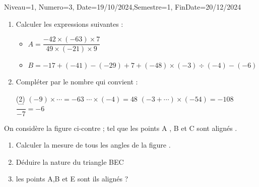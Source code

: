 \documentclass[a4paper,12pt]{article}
\begin{document}
\begin{Maquette}[DM]{Niveau=1, Numero=3, Date=19/10/2024,Semestre=1, FinDate=20/12/2024}

\begin{exercice}
\begin{enumerate}
\item Calculer les expressions suivantes :
\begin{itemize}
\item \(A= \dfrac{-42\times (-63)\times 7}{49\times (-21)\times 9}\)
\item \( B=-17+(-41)-(-29)+7+(-48)\times (-3)\div (-4)-(-6)\)
\end{itemize}

\item Compléter par le nombre qui convient :
\begin{tasks}[style=itemize](2)
\task \( (-9)\times \cdots = -63 \)
\task \( \cdots \times (-4) = 48\)
\task \( (-3+ \cdots )\times (-54)= -108\)
\task \(\dfrac{\cdots}{-7}=-6\)
\end{tasks}

\end{enumerate}
\end{exercice}

\begin{exercice}
\begin{minipage}{.58\linewidth}
On considère la figure ci-contre ; tel que les points A , B et C sont alignés .
\begin{enumerate}
\item Calculer la mesure de tous les angles de la figure .
\item Déduire la nature du triangle BEC
\item les points A,B et E sont ils alignés ?
\end{enumerate}
\end{minipage}
\begin{minipage}{.4\linewidth}
\end{minipage}
\end{exercice}
\end{Maquette}
\end{document}
